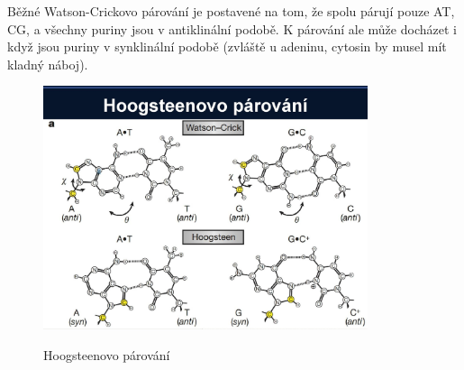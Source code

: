 \documentclass[DIV=8]{scrreprt}
\begin{document}
Běžné Watson-Crickovo párování je postavené na tom, že spolu párují pouze AT, CG, a všechny puriny jsou v antiklinální podobě. K párování ale může docházet i když jsou puriny v synklinální podobě (zvláště u adeninu, cytosin by musel mít kladný náboj).

\begin{figure}
    \caption{Hoogsteenovo párování}
    \includegraphics[width=0.85\textwidth]{slides-3/slide-50.jpg}
    \centering
    \label{}
\end{figure}
\end{document}
